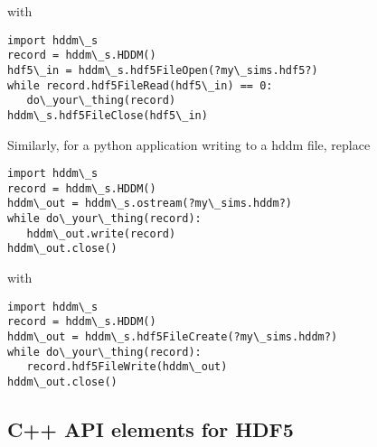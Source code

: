 \documentclass{revtex4}
\begin{document}
with

\vspace{0.5cm}
\begin{minipage}{12cm}
\begin{verbatim}
import hddm\_s
record = hddm\_s.HDDM()
hdf5\_in = hddm\_s.hdf5FileOpen(?my\_sims.hdf5?)
while record.hdf5FileRead(hdf5\_in) == 0:
   do\_your\_thing(record)
hddm\_s.hdf5FileClose(hdf5\_in)
\end{verbatim}
\end{minipage}
\vspace{0.5cm}

Similarly, for a python application writing to a hddm file, replace

\vspace{0.5cm}
\begin{minipage}{12cm}
\begin{verbatim}
import hddm\_s
record = hddm\_s.HDDM()
hddm\_out = hddm\_s.ostream(?my\_sims.hddm?)
while do\_your\_thing(record):
   hddm\_out.write(record)
hddm\_out.close()
\end{verbatim}
\end{minipage}
\vspace{0.5cm}

with

\vspace{0.5cm}
\begin{minipage}{12cm}
\begin{verbatim}
import hddm\_s
record = hddm\_s.HDDM()
hddm\_out = hddm\_s.hdf5FileCreate(?my\_sims.hddm?)
while do\_your\_thing(record):
   record.hdf5FileWrite(hddm\_out)
hddm\_out.close()
\end{verbatim}
\end{minipage}
\vspace{0.5cm}

\subsection{C++ API elements for HDF5}
\end{document}
